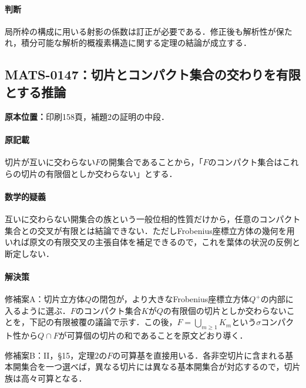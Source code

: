 \documentclass[a4paper,10pt]{ltjsarticle}
\begin{document}
\paragraph{判断}局所枠の構成に用いる射影の係数は訂正が必要である．修正後も解析性が保たれ，積分可能な解析的概複素構造に関する定理の結論が成立する．


\subsection*{MATS-0147：切片とコンパクト集合の交わりを有限とする推論}\label{math:MATS-0147}
\noindent\textbf{原本位置：}印刷158頁，補題2の証明の中段．

\paragraph{原記載}切片が互いに交わらない$F$の開集合であることから，「$F$のコンパクト集合はこれらの切片の有限個としか交わらない」とする．

\paragraph{数学的疑義}互いに交わらない開集合の族という一般位相的性質だけから，任意のコンパクト集合との交叉が有限とは結論できない．ただしFrobenius座標立方体の幾何を用いれば原文の有限交叉の主張自体を補足できるので，これを葉体の状況の反例と断定しない．

\paragraph{解決策}修補案A：切片立方体$Q$の閉包が，より大きなFrobenius座標立方体$Q^+$の内部に入るように選ぶ．$F$のコンパクト集合$K$が$Q$の有限個の切片としか交わらないことを，下記の有限被覆の議論で示す．この後，$F=\bigcup_{m\geq1}K_m$という$\sigma$コンパクト性から$Q\cap F$が可算個の切片の和であることを原文どおり導く．\par 修補案B：II，§15，定理2の$F$の可算基を直接用いる．各非空切片に含まれる基本開集合を一つ選べば，異なる切片には異なる基本開集合が対応するので，切片族は高々可算となる．
\end{document}
